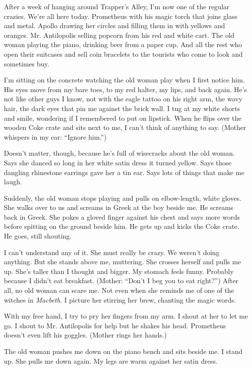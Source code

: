 \documentclass[twoside,10pt]{book}
\begin{document}
After a week of hanging around Trapper's Alley, I'm now one of the
regular crazies. We're all here today. Prometheus with his magic torch
that joins glass and metal. Apollo drawing her circles and filling them
in with yellows and oranges. Mr. Antilopolis selling popcorn from his
red and white cart. The old woman playing the piano, drinking beer from
a paper cup. And all the rest who open their suitcases and sell coin
bracelets to the tourists who come to look and sometimes buy.

I'm sitting on the concrete watching the old woman play when I first
notice him. His eyes move from my bare toes, to my red halter, my lips,
and back again. He's not like other guys I know, not with the eagle
tattoo on his right arm, the wavy hair, the dark eyes that pin me
against the brick wall. I tug at my white shorts and smile, wondering if
I remembered to put on lipstick. When he flips over the wooden Coke
crate and sits next to me, I can't think of anything to say. (Mother
whispers in my ear: ``Ignore him.'')

Doesn't matter, though, because he's full of wisecracks about the old
woman. Says she danced so long in her white satin dress it turned
yellow. Says those dangling rhinestone earrings gave her a tin ear. Says
lots of things that make me laugh.

Suddenly, the old woman stops playing and pulls on elbow-length, white
gloves. She walks over to us and screams in Greek at the boy beside me.
He screams back in Greek. She pokes a gloved finger against his chest
and says more words before spitting on the ground beside him. He gets up
and kicks the Coke crate. He goes, still shouting.

I can't understand any of it. She must really be crazy. We weren't doing
anything. But she stands above me, muttering. She crosses herself and
pulls me up. She's taller than I thought and big­ger. My stomach feels
funny. Probably because I didn't eat breakfast. (Mother: ``Don't I beg
you to eat right?'') After all, no old woman can scare me. Not even when
she reminds me of one of the witches in \emph{Macbeth}. I picture her
stirring her brew, chanting the magic words.

With my free hand, I try to pry her fingers from my arm. I shout at her
to let me go. I shout to Mr. Antilopolis for help but he shakes his
head. Prometheus doesn't even lift his goggles. (Mother rings her
hands.)

The old woman pushes me down on the piano bench and sits beside me. I
stand up. She pulls me down again. My legs are warm against her satin
dress.
\end{document}
